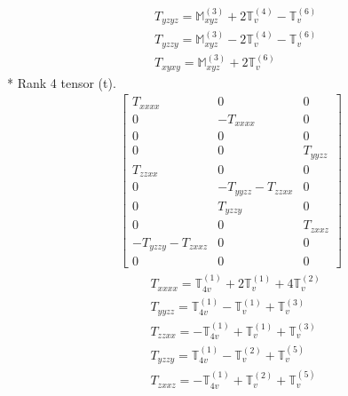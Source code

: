 \documentclass[fleqn,8pt,landscape]{jsarticle}
\begin{document}
\begin{align*}
& T_{yzyz} = \mathbb{M}_{xyz}^{(3)} + 2 \mathbb{T}_{v}^{(4)} - \mathbb{T}_{v}^{(6)} \\
& T_{yzzy} = \mathbb{M}_{xyz}^{(3)} - 2 \mathbb{T}_{v}^{(4)} - \mathbb{T}_{v}^{(6)} \\
& T_{xyxy} = \mathbb{M}_{xyz}^{(3)} + 2 \mathbb{T}_{v}^{(6)}
\end{align*}
* Rank 4 tensor (t).
\begin{align*}
\begin{bmatrix} T_{xxxx} & 0 & 0 \\ 0 & - T_{xxxx} & 0 \\ 0 & 0 & 0 \\ 0 & 0 & T_{yyzz} \\ T_{zzxx} & 0 & 0 \\ 0 & - T_{yyzz} - T_{zzxx} & 0 \\ 0 & T_{yzzy} & 0 \\ 0 & 0 & T_{zxxz} \\ - T_{yzzy} - T_{zxxz} & 0 & 0 \\ 0 & 0 & 0 \end{bmatrix}
\end{align*}
\begin{align*}
& T_{xxxx} = \mathbb{T}_{4v}^{(1)} + 2 \mathbb{T}_{v}^{(1)} + 4 \mathbb{T}_{v}^{(2)} \\
& T_{yyzz} = \mathbb{T}_{4v}^{(1)} - \mathbb{T}_{v}^{(1)} + \mathbb{T}_{v}^{(3)} \\
& T_{zzxx} = - \mathbb{T}_{4v}^{(1)} + \mathbb{T}_{v}^{(1)} + \mathbb{T}_{v}^{(3)} \\
& T_{yzzy} = \mathbb{T}_{4v}^{(1)} - \mathbb{T}_{v}^{(2)} + \mathbb{T}_{v}^{(5)} \\
& T_{zxxz} = - \mathbb{T}_{4v}^{(1)} + \mathbb{T}_{v}^{(2)} + \mathbb{T}_{v}^{(5)}
\end{align*}
\end{document}
